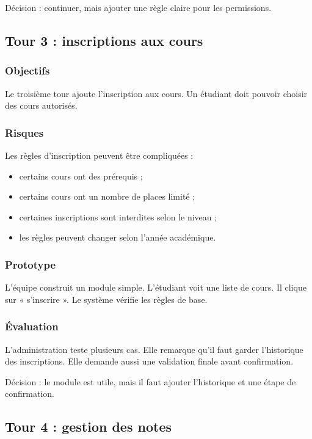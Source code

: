 \documentclass[12pt,a4paper]{article}
\begin{document}
Décision : continuer, mais ajouter une règle claire pour les permissions.

\subsection{Tour 3 : inscriptions aux cours}

\subsubsection{Objectifs}

Le troisième tour ajoute l'inscription aux cours. Un étudiant doit pouvoir choisir des cours autorisés.

\subsubsection{Risques}

Les règles d'inscription peuvent être compliquées :

\begin{itemize}
    \item certains cours ont des prérequis ;
    \item certains cours ont un nombre de places limité ;
    \item certaines inscriptions sont interdites selon le niveau ;
    \item les règles peuvent changer selon l'année académique.
\end{itemize}

\subsubsection{Prototype}

L'équipe construit un module simple. L'étudiant voit une liste de cours. Il clique sur « s'inscrire ». Le système vérifie les règles de base.

\subsubsection{Évaluation}

L'administration teste plusieurs cas. Elle remarque qu'il faut garder l'historique des inscriptions. Elle demande aussi une validation finale avant confirmation.

Décision : le module est utile, mais il faut ajouter l'historique et une étape de confirmation.

\subsection{Tour 4 : gestion des notes}
\end{document}
